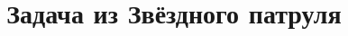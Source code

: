 \documentclass[a4paper]{article}
\begin{document}
\title{Задача из Звёздного патруля}

\stealcurrent
\end{document}
